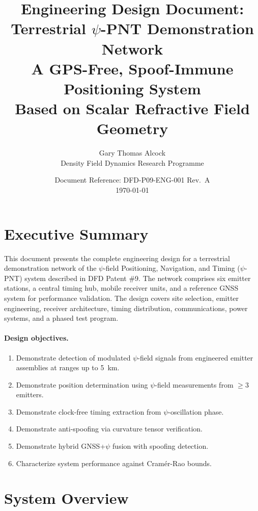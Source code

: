 \documentclass[11pt,a4paper]{article}
\title{Engineering Design Document:\\
Terrestrial $\psi$-PNT Demonstration Network\\[0.5em]
\large A GPS-Free, Spoof-Immune Positioning System\\
Based on Scalar Refractive Field Geometry}
\author{Gary Thomas Alcock\\
\small Density Field Dynamics Research Programme}
\date{Document Reference: DFD-P09-ENG-001 \quad Rev.~A\\[0.3em] \today}
\begin{document}
\maketitle
\tableofcontents
\newpage

\section{Executive Summary}

This document presents the complete engineering design for a terrestrial
demonstration network of the $\psi$-field Positioning, Navigation, and
Timing ($\psi$-PNT) system described in DFD Patent \#9. The network
comprises six emitter stations, a central timing hub, mobile receiver
units, and a reference GNSS system for performance validation. The design
covers site selection, emitter engineering, receiver architecture, timing
distribution, communications, power systems, and a phased test program.

\paragraph{Design objectives.}
\begin{enumerate}[label=(\alph*)]
\item Demonstrate detection of modulated $\psi$-field signals from
  engineered emitter assemblies at ranges up to 5~km.
\item Demonstrate position determination using $\psi$-field
  measurements from $\geq 3$ emitters.
\item Demonstrate clock-free timing extraction from $\psi$-oscillation
  phase.
\item Demonstrate anti-spoofing via curvature tensor verification.
\item Demonstrate hybrid GNSS+$\psi$ fusion with spoofing detection.
\item Characterize system performance against Cram\'er-Rao bounds.
\end{enumerate}

\section{System Overview}
\end{document}
